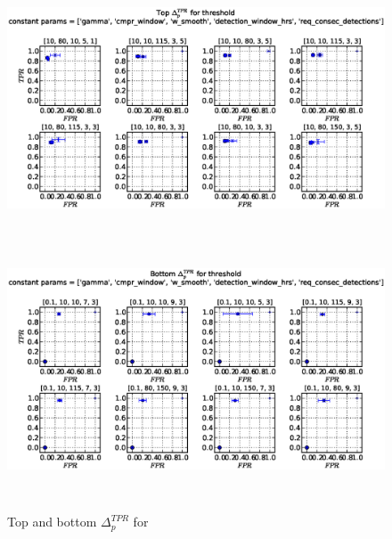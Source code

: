 \begin{figure}[!h]
\begin{center}
\includegraphics[height=3in]{../fig/final/top_tpr/threshold}
\includegraphics[height=3in]{../fig/final/bottom_tpr/threshold}
\end{center}
\caption{\label{fig:delta_top_bottom3t} Top and bottom $\Delta_p^{TPR}$ for }
\end{figure}



